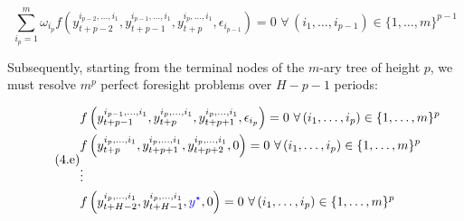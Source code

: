\documentclass[a4paper,11pt]{amsart}
\begin{document}
\begin{equation}\label{sep:perfect:p}\tag{4.d}
   \sum_{i_p=1}^m \omega_{i_p} f\left(y_{t+p-2}^{i_{p-2},\ldots,i_1}, y_{t+p-1}^{i_{p-1},\ldots,i_1}, y_{t+p}^{i_p,\ldots,i_1}, \epsilon_{i_{p-1}} \right) = 0\,\,  \forall\, (i_1,\ldots,i_{p-1})\in \{1,\dots,m\}^{p-1}
\end{equation}

Subsequently, starting from the terminal nodes of the \(m\)-ary tree of height \( p \), we must resolve \(m^p\) perfect foresight problems over \(H-p-1\) periods:

\begin{equation}\label{sep:perfect:leafs}\tag{4.e}
   \begin{split}
       & f\left(y_{t+p-1}^{i_{p-1},\ldots,i_1}, y_{t+p}^{i_{p},\ldots,i_1}, y_{t+p+1}^{i_p,\ldots,i_1}, \epsilon_{i_{p}} \right) = 0\,\,  \forall\, (i_1,\ldots,i_{p})\in \{1,\dots,m\}^{p} \\
       & f\left(y_{t+p}^{i_{p},\ldots,i_1}, y_{t+p+1}^{i_{p},\ldots,i_1}, y_{t+p+2}^{i_p,\ldots,i_1}, 0 \right) = 0\,\,  \forall\, (i_1,\ldots,i_{p})\in \{1,\dots,m\}^{p}                  \\
       & \vdots                                                                                                                                                                             \\
       & f\left(y_{t+H-2}^{i_{p},\ldots,i_1}, y_{t+H-1}^{i_{p},\ldots,i_1}, {\color{blue}y^{\star}}, 0 \right) = 0\,\,  \forall\, (i_1,\ldots,i_{p})\in \{1,\dots,m\}^{p}
   \end{split}
\end{equation}
\end{document}
